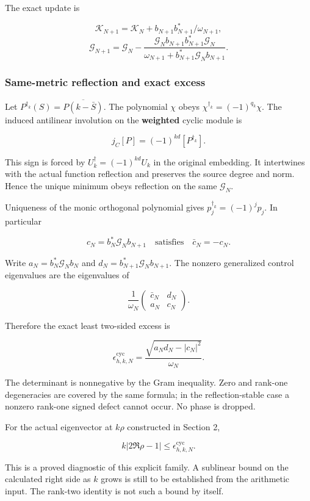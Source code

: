 The exact update is

\[\mathcal K_{N+1}=\mathcal K_N+b_{N+1}b_{N+1}^*/\omega_{N+1},\]
\[\mathcal G_{N+1}=\mathcal G_N-
\frac{\mathcal G_Nb_{N+1}b_{N+1}^*\mathcal G_N}
{\omega_{N+1}+b_{N+1}^*\mathcal G_Nb_{N+1}}.\tag{4.10}\]

\subsubsection{Same-metric reflection and exact
excess}\label{cyclic_sum:same-metric-reflection-and-exact-excess}

Let \(P^{\dagger_k}(S)=\overline{P(k-\bar S)}\). The polynomial \(\chi\)
obeys \(\chi^{\dagger_k}=(-1)^{q_k}\chi\). The induced antilinear
involution on the \textbf{weighted} cyclic module is

\[j_C[P]=(-1)^{kd}[P^{\dagger_k}].\tag{4.11}\]

This sign is forced by \(U_k^\dagger=(-1)^{kd}U_k\) in the original
embedding. It intertwines with the actual function reflection and
preserves the source degree and norm. Hence the unique minimum obeys
reflection on the same \(\mathcal G_N\).

Uniqueness of the monic orthogonal polynomial gives
\(p_j^{\dagger_k}=(-1)^jp_j\). In particular

\[c_N=b_N^*\mathcal G_Nb_{N+1}\quad\text{satisfies}\quad \bar c_N=-c_N.\]

Write \(a_N=b_N^*\mathcal G_Nb_N\) and
\(d_N=b_{N+1}^*\mathcal G_Nb_{N+1}\). The nonzero generalized control
eigenvalues are the eigenvalues of

\[\frac1{\omega_N}\begin{pmatrix}\bar c_N&d_N\\a_N&c_N\end{pmatrix}.\]

Therefore the exact least two-sided excess is

\[\boxed{\epsilon_{h,k,N}^{\mathrm{cyc}}=
\frac{\sqrt{a_Nd_N-|c_N|^2}}{\omega_N}.}\tag{4.12}\]

The determinant is nonnegative by the Gram inequality. Zero and rank-one
degeneracies are covered by the same formula; in the reflection-stable
case a nonzero rank-one signed defect cannot occur. No phase is dropped.

For the actual eigenvector at \(k\rho\) constructed in Section 2,

\[\boxed{k|2\Re\rho-1|\le\epsilon_{h,k,N}^{\mathrm{cyc}}.}\tag{4.13}\]

This is a proved diagnostic of this explicit family. A sublinear bound
on the calculated right side as \(k\) grows is still to be established
from the arithmetic input. The rank-two identity is not such a bound by
itself.

